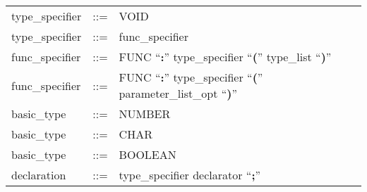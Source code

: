 \begin{longtable}{lrl}
type\_specifier                            & ::= &
  \begin{minipage}[t]{\rulerhs}
    \raggedright
    VOID
  \end{minipage}                                                             \\
type\_specifier                            & ::= &
  \begin{minipage}[t]{\rulerhs}
    \raggedright
    func\_specifier
  \end{minipage}                                                             \\
func\_specifier                            & ::= &
  \begin{minipage}[t]{\rulerhs}
    \raggedright
    FUNC ``{\bf :}'' type\_specifier ``{\bf (}'' type\_list ``{\bf )}''
  \end{minipage}                                                             \\
func\_specifier                            & ::= &
  \begin{minipage}[t]{\rulerhs}
    \raggedright
    FUNC ``{\bf :}'' type\_specifier ``{\bf (}'' parameter\_list\_opt ``{\bf )}''
  \end{minipage}                                                             \\
basic\_type                                & ::= &
  \begin{minipage}[t]{\rulerhs}
    \raggedright
    NUMBER
  \end{minipage}                                                             \\
basic\_type                                & ::= &
  \begin{minipage}[t]{\rulerhs}
    \raggedright
    CHAR
  \end{minipage}                                                             \\
basic\_type                                & ::= &
  \begin{minipage}[t]{\rulerhs}
    \raggedright
    BOOLEAN
  \end{minipage}                                                             \\
declaration                                & ::= &
  \begin{minipage}[t]{\rulerhs}
    \raggedright
    type\_specifier declarator ``{\bf ;}''
  \end{minipage}                                                             \\

\end{longtable}

